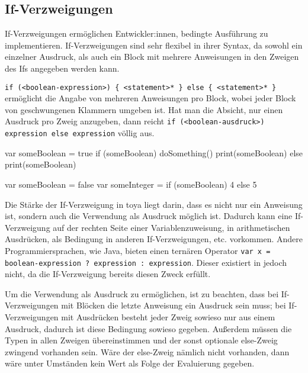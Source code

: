 
\subsection{If-Verzweigungen}

If-Verzweigungen ermöglichen Entwickler:innen, bedingte Ausführung zu implementieren. If-Verzweigungen sind sehr flexibel in ihrer Syntax, da sowohl ein einzelner Ausdruck, als auch ein Block mit mehrere Anweisungen in den Zweigen des Ifs angegeben werden kann. 

\texttt{if (<boolean-expression>) \{ <statement>* \} else \{ <statement>* \}} ermöglicht die Angabe von mehreren Anweisungen pro Block, wobei jeder Block von geschwungenen Klammern umgeben ist. Hat man die Absicht, nur einen Ausdruck pro Zweig anzugeben, dann reicht \texttt{if (<boolean-ausdruck>) expression else expression} völlig aus.

\begin{ToyaCode}[numbers=none, caption={If-Verzweigung als klassische Anweisung.}]
var someBoolean = true
if (someBoolean) {
    doSomething()
    print(someBoolean)
} else {
    print(someBoolean)
}
\end{ToyaCode}

\begin{ToyaCode}[numbers=none, caption={If-Verzweigung als Ausdruck in einer Variablenzuweisung.}]
var someBoolean = false
var someInteger = if (someBoolean) 4 else 5
\end{ToyaCode}

Die Stärke der If-Verzweigung in toya liegt darin, dass es nicht nur ein Anweisung ist, sondern auch die Verwendung als Ausdruck möglich ist. Dadurch kann eine If-Verzweigung auf der rechten Seite einer Variablenzuweisung, in arithmetischen Ausdrücken, als Bedingung in anderen If-Verzweigungen, etc. vorkommen. Andere Programmiersprachen, wie Java, bieten einen ternären Operator \texttt{var x = boolean-expression ? expression : expression}. Dieser existiert in \toya jedoch nicht, da die If-Verzweigung bereits diesen Zweck erfüllt. 


Um die Verwendung als Ausdruck zu ermöglichen, ist zu beachten, dass bei If-Verzweigungen mit Blöcken die letzte Anweisung ein Ausdruck sein muss; bei If-Verzweigungen mit Ausdrücken besteht jeder Zweig sowieso nur aus einem Ausdruck, dadurch ist diese Bedingung sowieso gegeben. Außerdem müssen die Typen in allen Zweigen übereinstimmen und der sonst optionale else-Zweig zwingend vorhanden sein. Wäre der else-Zweig nämlich nicht vorhanden, dann wäre unter Umständen kein Wert als Folge der Evaluierung gegeben.

